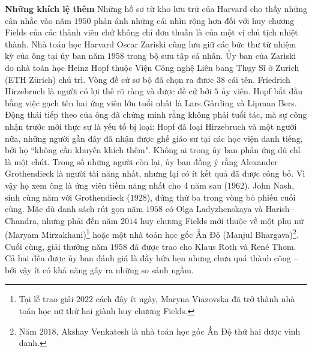 \begin{multicols}{2}
	\vskip 0.05cm
	\textbf{\color{lichsutoanhoc}Những khích lệ thêm}
	\vskip 0.05cm
	Những hồ sơ từ kho lưu trữ của Harvard cho thấy những cân nhắc vào năm $1950$ phản ánh những cái nhìn rộng hơn đối với huy chương Fields của các thành viên chứ không chỉ đơn thuần là của một vị chủ tịch nhiệt thành. Nhà toán học Harvard Oscar Zariski cũng lưu giữ các bức thư từ nhiệm kỳ của ông tại ủy ban năm $1958$ trong bộ sưu tập cá nhân.
	\vskip 0.05cm
	Ủy ban của Zariski do nhà toán học Heinz Hopf thuộc Viện Công nghệ Liên bang Thụy Sĩ ở Zurich (ETH Zürich) chủ trì. Vòng đề cử sơ bộ đã chọn ra đươc $38$ cái tên. Friedrich Hirzebruch là người có lợi thế rõ ràng và được đề cử bởi $5$ ủy viên.
	\vskip 0.05cm
	Hopf bắt đầu bằng việc gạch tên hai ứng viên lớn tuổi nhất là Lars Gårding và Lipman Bers. Động thái tiếp theo của ông đã chứng minh rằng không phải tuổi tác, mà sự công nhận trước mới thực sự là yếu tố bị loại: Hopf đã loại Hirzebruch và một người nữa, những người gần đây đã nhận được ghế giáo sư tại các học viện danh tiếng, bởi họ ``không cần khuyến khích thêm". Không ai trong ủy ban phản ứng dù chỉ là một chút.
	\vskip 0.05cm
	Trong số những người còn lại, ủy ban đồng ý rằng Alexander Grothendieck là người tài năng nhất, nhưng lại có ít kết quả đã được công bố. Vì vậy họ xem ông là ứng viên tiềm năng nhất cho $4$ năm sau ($1962$). John Nash, sinh cùng năm với Grothendieck ($1928$), đứng thứ ba trong vòng bỏ phiếu cuối cùng. Mặc dù danh sách rút gọn năm $1958$ có Olga Ladyzhenskaya và Harish--Chandra, nhưng phải đến năm $2014$ huy chương Fields mới thuộc về một phụ nữ (Maryam Mirzakhani)\footnote[10]{\color{lichsutoanhoc}Tại lễ trao giải $2022$ cách đây ít ngày, Maryna Viazovska đã trở thành nhà toán học nữ thứ hai giành huy chương Fields.} hoặc một nhà toán học gốc Ấn Độ (Manjul Bhargava)\footnote[11]{\color{lichsutoanhoc}Năm $2018$, Akshay Venkatesh là nhà toán học gốc Ấn Độ thứ hai được vinh danh.}. Cuối cùng, giải thưởng năm $1958$ đã được trao cho Klaus Roth và René Thom. Cả hai đều được ủy ban đánh giá là đầy hứa hẹn nhưng chưa quá thành công -- bởi vậy ít có khả năng gây ra những so sánh ngầm.
	\begin{figure}[H]
		\vspace*{-5pt}
		\centering
		\captionsetup{labelformat= empty, justification=centering}

\end{figure}
\end{multicols}
